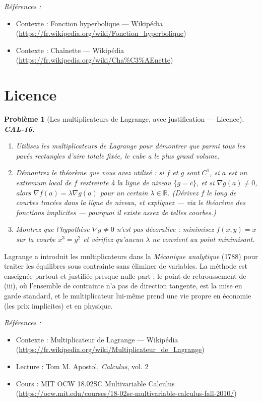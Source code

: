 \documentclass[11pt]{article}
\newtheorem{problem}{Problème}
\newenvironment{refs}{\par\small\noindent\emph{Références :}\begin{itemize}\setlength\itemsep{0pt}}{\end{itemize}\normalsize}
\begin{document}
\begin{refs}
\item Contexte : Fonction hyperbolique --- Wikipédia (\url{https://fr.wikipedia.org/wiki/Fonction_hyperbolique})
\item Contexte : Chaînette --- Wikipédia (\url{https://fr.wikipedia.org/wiki/Cha%C3%AEnette})
\end{refs}

\bigskip


\section*{Licence}

\begin{problem}[{Les multiplicateurs de Lagrange, avec justification --- Licence}]
\textbf{CAL-16.} \begin{enumerate}
\item[(i)] Utilisez les multiplicateurs de Lagrange pour démontrer que parmi tous les
pavés rectangles d'aire totale fixée, le cube a le plus grand volume.
\item[(ii)] Démontrez le théorème que vous avez utilisé : si $ f $ et $ g $ sont $ C^1 $, si $ a $ est un
extremum local de $ f $ restreinte à la ligne de niveau $ \{g = c\} $, et si
$ \nabla g(a) \ne 0 $, alors $ \nabla f(a) = \lambda \nabla g(a) $ pour un certain
$ \lambda\in\mathbb{R} $. (Dérivez $ f $ le long de courbes tracées dans la ligne de niveau,
et expliquez --- via le théorème des fonctions implicites --- pourquoi il existe assez de telles courbes.)
\item[(iii)] Montrez que l'hypothèse $ \nabla g \ne 0 $ n'est pas décorative : minimisez
$ f(x,y) = x $ sur la courbe $ x^3 = y^2 $ et vérifiez qu'aucun $ \lambda $ ne convient au
point minimisant.
\end{enumerate}

\end{problem}

\noindent Lagrange a introduit les multiplicateurs dans la \textit{Mécanique analytique}
(1788) pour traiter les équilibres sous contrainte sans éliminer de variables. La méthode est
enseignée partout et justifiée presque nulle part ; le point de rebroussement de (iii), où l'ensemble de
contrainte n'a pas de direction tangente, est la mise en garde standard, et le multiplicateur lui-même
prend une vie propre en économie (les prix implicites) et en physique.

\begin{refs}
\item Contexte : Multiplicateur de Lagrange --- Wikipédia (\url{https://fr.wikipedia.org/wiki/Multiplicateur_de_Lagrange})
\item Lecture : Tom M. Apostol, \textit{Calculus}, vol. 2
\item Cours : MIT OCW 18.02SC Multivariable Calculus (\url{https://ocw.mit.edu/courses/18-02sc-multivariable-calculus-fall-2010/})
\end{refs}
\end{document}
